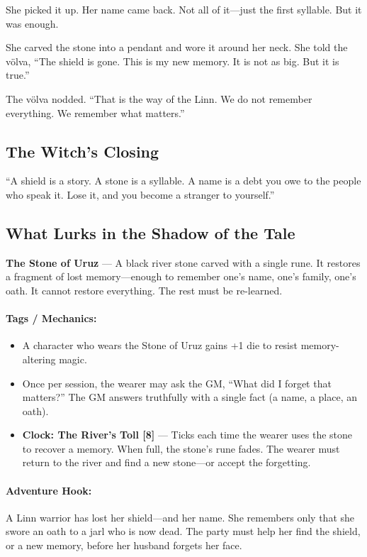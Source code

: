 \documentclass[9pt,a5paper]{extbook}
\begin{document}
She picked it up. Her name came back. Not all of it---just the first syllable. But it was enough.

She carved the stone into a pendant and wore it around her neck. She told the völva, ``The shield is gone. This is my new memory. It is not as big. But it is true.''

The völva nodded. ``That is the way of the Linn. We do not remember everything. We remember what matters.''

\subsection*{The Witch's Closing}

``A shield is a story. A stone is a syllable. A name is a debt you owe to the people who speak it. Lose it, and you become a stranger to yourself.''

\subsection*{What Lurks in the Shadow of the Tale}

\textbf{The Stone of Uruz} --- A black river stone carved with a single rune. It restores a fragment of lost memory---enough to remember one's name, one's family, one's oath. It cannot restore everything. The rest must be re-learned.

\paragraph{Tags / Mechanics:}
\begin{itemize}
    \item A character who wears the Stone of Uruz gains +1 die to resist memory-altering magic.
    \item Once per session, the wearer may ask the GM, ``What did I forget that matters?'' The GM answers truthfully with a single fact (a name, a place, an oath).
    \item \textbf{Clock: The River's Toll [8]} --- Ticks each time the wearer uses the stone to recover a memory. When full, the stone's rune fades. The wearer must return to the river and find a new stone---or accept the forgetting.
\end{itemize}

\paragraph{Adventure Hook:}
A Linn warrior has lost her shield---and her name. She remembers only that she swore an oath to a jarl who is now dead. The party must help her find the shield, or a new memory, before her husband forgets her face.
\end{document}
